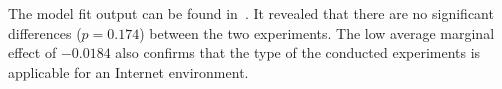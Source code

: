 The model fit output can be found in~\cite{schoeffler13}.
It revealed that there are no significant differences ($p = 0.174$) between the two experiments. The low average marginal effect of $-0.0184$ also confirms that the type of the conducted experiments is applicable for an Internet environment.

